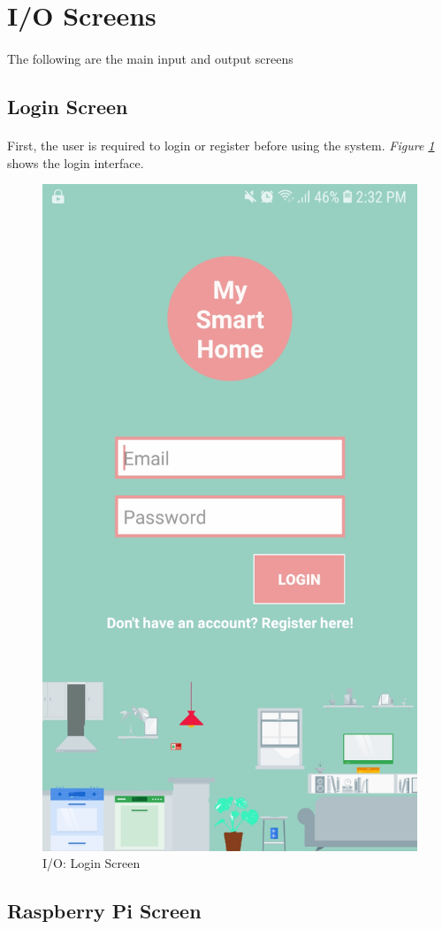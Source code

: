 \documentclass[12pt, oneside, a4paper]{book}
\begin{document}
		\newpage\section{I/O Screens}
		\paragraph{} The following are the main input and output screens
		\subsection{Login Screen}
		\paragraph{} First, the user is required to login or register before using the system. \textit{Figure \ref{output:login}} shows the login interface.
		\begin{figure}[H]
			\centering
			\includegraphics[width=.5\linewidth]{img/output_login.jpg}
			\caption{I/O: Login Screen}
			\label{output:login}
		\end{figure}
	
		\newpage\subsection{Raspberry Pi Screen}
\end{document}
